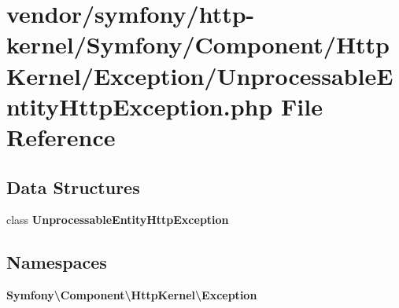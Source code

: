 \section{vendor/symfony/http-\/kernel/\+Symfony/\+Component/\+Http\+Kernel/\+Exception/\+Unprocessable\+Entity\+Http\+Exception.php File Reference}
\label{_unprocessable_entity_http_exception_8php}
\subsection*{Data Structures}
\begin{DoxyCompactItemize}
\item 
class {\bf Unprocessable\+Entity\+Http\+Exception}
\end{DoxyCompactItemize}
\subsection*{Namespaces}
\begin{DoxyCompactItemize}
\item 
 {\bf Symfony\textbackslash{}\+Component\textbackslash{}\+Http\+Kernel\textbackslash{}\+Exception}
\end{DoxyCompactItemize}
